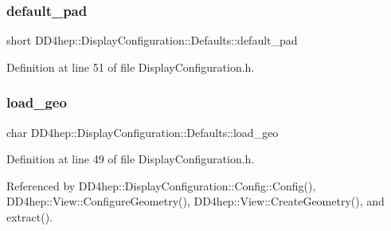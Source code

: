 \hypertarget{struct_d_d4hep_1_1_display_configuration_1_1_defaults_a3c5fed67372178924ac8af2555704f4b}{}\label{struct_d_d4hep_1_1_display_configuration_1_1_defaults_a3c5fed67372178924ac8af2555704f4b} 
\subsubsection{\texorpdfstring{default\+\_\+pad}{default\_pad}}
{\footnotesize\ttfamily short D\+D4hep\+::\+Display\+Configuration\+::\+Defaults\+::default\+\_\+pad}



Definition at line 51 of file Display\+Configuration.\+h.

\hypertarget{struct_d_d4hep_1_1_display_configuration_1_1_defaults_ad70e6ccfad33fb7a2282b01fb4118fc9}{}\label{struct_d_d4hep_1_1_display_configuration_1_1_defaults_ad70e6ccfad33fb7a2282b01fb4118fc9} 
\subsubsection{\texorpdfstring{load\+\_\+geo}{load\_geo}}
{\footnotesize\ttfamily char D\+D4hep\+::\+Display\+Configuration\+::\+Defaults\+::load\+\_\+geo}



Definition at line 49 of file Display\+Configuration.\+h.



Referenced by D\+D4hep\+::\+Display\+Configuration\+::\+Config\+::\+Config(), D\+D4hep\+::\+View\+::\+Configure\+Geometry(), D\+D4hep\+::\+View\+::\+Create\+Geometry(), and extract().

\hypertarget{struct_d_d4hep_1_1_display_configuration_1_1_defaults_a63fc69fe802d80627939c1f00d188cde}{}\label{struct_d_d4hep_1_1_display_configuration_1_1_defaults_a63fc69fe802d80627939c1f00d188cde} 
